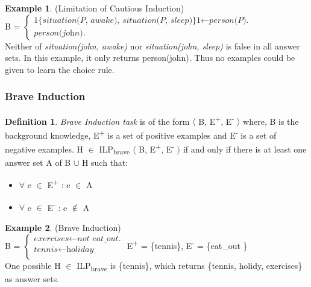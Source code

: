 \documentclass[12pt,twoside]{report}
\theoremstyle{plain}
\theoremstyle{definition}
\newtheorem{defn}[thm]{Definition} %
\newtheorem{examp}{Example}[section]
\begin{document}
\begin{examp} \normalfont (Limitation of Cautious Induction) \\

B = $\begin{cases}
	\textit{1\{situation(P, awake), situation(P, sleep)\}1} \leftarrow \textit{person(P).} \\
	\textit{person(john).}
      \end{cases}$ \\

Neither of \textit{situation(john, awake)} nor \textit{situation(john, sleep)} is false in all answer sets. In this example, it only returns person(john). Thus no examples could be given to learn the choice rule.
\end{examp}

\label{limitation_cautious}

\subsubsection{Brave Induction}
\begin{defn}
\textit{Brave Induction task} is of the form $\langle$ B, E\textsuperscript{+}, E\textsuperscript{-} $\rangle$ where, B is the background knowledge, E\textsuperscript{+} is a set of positive examples and E\textsuperscript{-} is a set of negative examples.
 H $\in$ ILP\textsubscript{brave} $\langle$ B, E\textsuperscript{+}, E\textsuperscript{-} $\rangle$ if and only if there is at least one answer set A of B $\cup$ H such that: \\
\begin{itemize}
\item $\forall$ e $\in$ E\textsuperscript{+} : e $\in$ A \\
\item $\forall$ e $\in$ E\textsuperscript{-} : e $\notin$ A \\
\end{itemize}
\end{defn}

\begin{examp} \normalfont (Brave Induction) \\

B = $\begin{cases}
	\textit{exercises}  \leftarrow \textit{not \ eat\_out.} \\
	\textit{tennis} \leftarrow \textit{holiday} \\
      \end{cases}$
E\textsuperscript{+} = \{tennis\},   E\textsuperscript{-} = \{eat\_out \} \\

One possible  H $\in$ ILP\textsubscript{brave} is \{tennis\}, which returns \{tennis, holidy, exercises\} as answer sets.
\end{examp}
\label{brave_induction_example}
\end{document}
